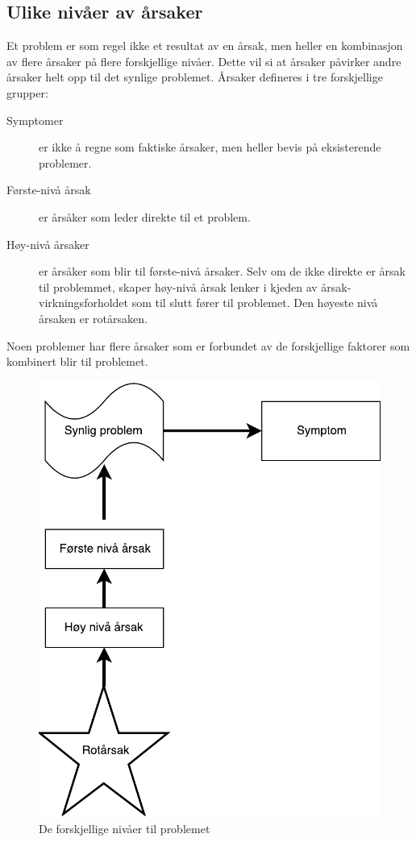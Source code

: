 \subsection{Ulike nivåer av årsaker}
Et problem er som regel ikke et resultat av en årsak, men heller en kombinasjon av flere årsaker på flere forskjellige nivåer. Dette vil si at årsaker påvirker andre årsaker helt opp til det synlige problemet. Årsaker defineres i tre forskjellige grupper: 

\begin{description}
    \item[Symptomer] er ikke å regne som faktiske årsaker, men heller bevis på eksisterende problemer.
    \item[Første-nivå årsak] er årsåker som leder direkte til et problem.
    \item[Høy-nivå årsaker] er årsåker som blir til første-nivå årsaker. Selv om de ikke direkte er årsak til problemmet, skaper høy-nivå årsak lenker i kjeden av årsak-virkningsforholdet som til slutt fører til problemet. Den høyeste nivå årsaken er rotårsaken.  
\end{description}
Noen problemer har flere årsaker som er forbundet av de forskjellige faktorer som kombinert blir til problemet.

\begin{figure}[H]
    \centering
    \includegraphics[scale=0.6]{main/bilder/nivaa.pdf}
    \caption[Nivå]{De forskjellige nivåer til problemet}
    \label{fig:nivaa}
\end{figure}

